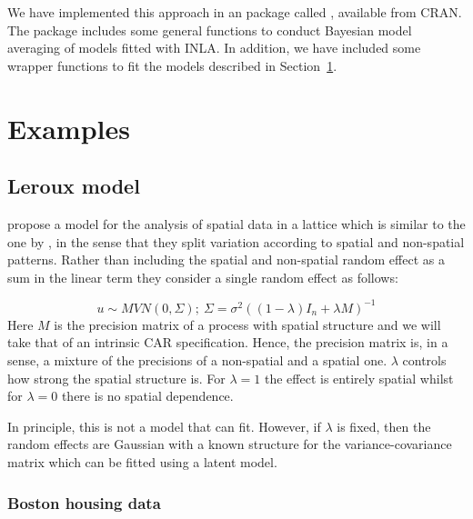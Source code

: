 \documentclass[article]{jss}
\begin{document}
We have implemented this approach in an  package called ,
available from CRAN.
The package includes some
general functions to conduct Bayesian model averaging of models fitted with
INLA. In addition, we have included some wrapper functions to fit the models
described in Section~\ref{sec:examples}.


\section{Examples}
\label{sec:examples}

\subsection{Leroux model}

\citet{Lerouxetal:1999} propose a model for the analysis of spatial data in a
lattice which is similar to the one by \citet{besagetal:1991}, in the sense
that they split variation according to  spatial and non-spatial patterns.
Rather than including the spatial and non-spatial random effect as a sum in the
linear term they consider a single random effect as follows:

\begin{equation}
u \sim MVN(0, \Sigma);\ \Sigma=\sigma^2 ((1-\lambda) I_n+\lambda M)^{-1}
\label{eq:leroux}
\end{equation}
\noindent
Here $M$ is the precision matrix of a process with spatial structure and we
will take that of an intrinsic CAR specification. Hence, the precision matrix
is, in a sense, a mixture of the precisions of a non-spatial and a spatial
one. $\lambda$ controls how strong the spatial structure is. For $\lambda=1$
the effect is entirely spatial whilst for $\lambda=0$ there is no spatial
dependence.

In principle, this is not a model that  can fit. However, if
$\lambda$ is fixed, then the random effects are Gaussian with a known structure
for the variance-covariance matrix which can be fitted using a 
latent model.

\subsubsection{Boston housing data}
\end{document}

